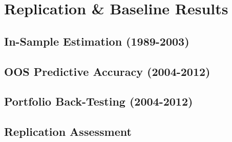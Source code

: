 
\section{Replication \& Baseline Results}
\subsection{In-Sample Estimation (1989-2003)}
\subsection{OOS Predictive Accuracy (2004-2012)}
\subsection{Portfolio Back-Testing (2004-2012)}
\subsection{Replication Assessment}
\newpage
